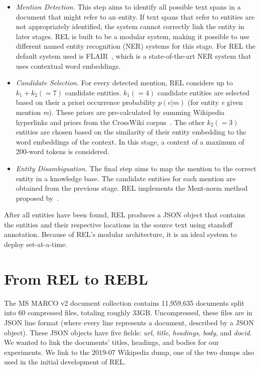 \begin{itemize}
	\item \emph{Mention Detection.} 
	This step aims to identify all possible text spans in a document that might refer to an entity. If text spans that refer to entities are not appropriately identified, the system cannot correctly link the entity in later stages. REL is built to be a modular system, making it possible to use different named entity recognition (NER) systems for this stage. For REL the default system used is FLAIR~\citep{flair}, which is a state-of-the-art NER system that uses contextual word embeddings. 
	\item \emph{Candidate Selection.}
	For every detected mention, REL considers up to $k_1 + k_2 (=7)$ candidate entities. $k_1 (=4)$ candidate entities are selected based on their a priori occurrence probability $p(e|m)$ (for entity \textit{e} given mention \textit{m}). These priors are pre-calculated by summing Wikipedia hyperlinks and priors from the CrossWiki corpus~\citep{crosswiki}. The other $k_2 (=3)$ entities are chosen based on the similarity of their entity embedding to the word embeddings of the context. In this stage, a context of a maximum of 200-word tokens is considered.
	\item \emph{Entity Disambiguation.}
	The final step aims to map the mention to the correct entity in a knowledge base. The candidate entities for each mention are obtained from the previous stage. REL implements the Ment-norm method proposed by~\citet{ED-paper}.  
\end{itemize} 

After all entities have been found, REL produces a JSON object that contains the entities and their respective locations in the source text using standoff annotation. Because of REL's modular architecture, it is an ideal system to deploy set-at-a-time. 

\section{From REL to REBL}
The MS MARCO v2 document collection contains 11,959,635 documents split into 60 compressed files, totaling roughly 33GB. Uncompressed, these files are in JSON line format (where every line represents a document, described by a JSON object). These JSON objects have five fields: \textit{url}, \textit{title}, \textit{headings}, \textit{body}, and \textit{docid}. We wanted to link the documents' titles, headings, and bodies for our experiments. We link to the 2019-07 Wikipedia dump, one of the two dumps also used in the initial development of REL. 

